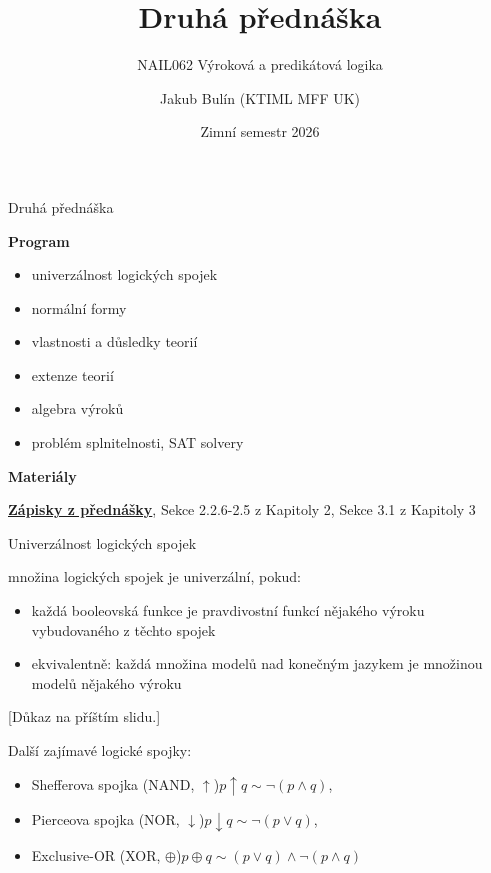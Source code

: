 \documentclass{beamer}
\title{Druhá přednáška}
\subtitle{NAIL062 Výroková a predikátová logika}
\author{Jakub Bulín (KTIML MFF UK)}
\date{Zimní semestr 2026}
\begin{document}
\maketitle


\begin{frame}{Druhá přednáška}

    \textbf{Program}
        \begin{itemize}
            \item univerzálnost logických spojek
            \item normální formy
            \item vlastnosti a důsledky teorií
            \item extenze teorií
            \item algebra výroků
            \item problém splnitelnosti, SAT solvery
        \end{itemize}   

    \textbf{Materiály}

        \href{https://github.com/jbulin-mff-uk/nail062/raw/main/lecture/lecture-notes/lecture-notes.pdf}{\alert{\textbf{Zápisky z přednášky}}}, Sekce 2.2.6-2.5 z Kapitoly 2, Sekce 3.1 z Kapitoly 3

\end{frame}


\begin{frame}{Univerzálnost logických spojek}

    množina logických spojek je \alert{univerzální}, pokud:
    \begin{itemize}        
        \item každá booleovská funkce je pravdivostní funkcí nějakého výroku vybudovaného z těchto spojek\pause
        \item ekvivalentně: každá množina modelů nad konečným jazykem je množinou modelů nějakého výroku
    \end{itemize}

    \pause
    
    {\footnotesize [Důkaz na příštím slidu.]}

    \pause
    Další zajímavé logické spojky:
    \begin{itemize}
        \item \alert{Shefferova spojka} (NAND, $\uparrow$)\hfill $p\uparrow q \sim \neg (p\land q)$,
        \item \alert{Pierceova spojka} (NOR, $\downarrow$)\hfill $p\downarrow q \sim \neg (p\lor q)$,
        \item \alert{Exclusive-OR} (XOR, $\oplus$)\hfill $p\oplus q \sim (p\lor q)\land\neg(p\land q)$
    \end{itemize}

    \pause

\end{frame}
\end{document}

